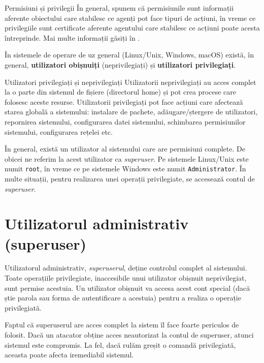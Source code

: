 \begin{definition}{Permisiuni și privilegii}
În general, spunem că permisiunile sunt informații
aferente obiectului care stabilesc ce agenți pot face tipuri de acțiuni, în
vreme ce privilegiile sunt certificate aferente agentului care stabilesc ce
acțiuni poate acesta întreprinde. Mai multe informații găsiți în
.
\end{definition}

În sistemele de operare de uz general (Linux/Unix, Windows, macOS) există, în
general, \textbf{utilizatori obișnuiți} (neprivilegiați) și \textbf{utilizatori privilegiați}.

\begin{definition}{Utilizatori privilegiați și neprivilegiați}
Utilizatorii neprivilegiați au acces complet la o parte din sistemul de fișiere
(directorul home) și pot crea procese care folosesc aceste resurse. Utilizatorii
privilegiați pot face acțiuni care afectează starea globală a sistemului:
instalare de pachete, adăugare/ștergere de utilizatori, repornirea sistemului,
configurarea datei sistemului, schimbarea permisiunilor sistemului, configurarea
rețelei etc.
\end{definition}

În general, există un utilizator al sistemului care are permisiuni complete.
De obicei ne referim la acest utilizator ca \textit{superuser}. Pe sistemele
Linux/Unix este numit \texttt{root}, în vreme ce pe sistemele Windows este numit
\texttt{Administrator}. În multe situații, pentru realizarea unei operații
privilegiate, se accesează contul de \textit{superuser}.

\section{Utilizatorul administrativ (superuser)}
\label{sec:user:superuser}

Utilizatorul administrativ, \textit{superuserul}, deține controlul complet al
sistemului. Toate operațiile privilegiate, inaccesibile unui utilizator obișnuit
neprivilegiat, sunt permise acestuia. Un utilizator obișnuit va accesa acest
cont special (dacă știe parola sau forma de autentificare a acestuia) pentru a
realiza o operație privilegiată.

Faptul că superuserul are acces complet la sistem îl face foarte periculos de
folosit. Dacă un atacator obține acces neautorizat la contul de superuser,
atunci sistemul este compromis. La fel, dacă rulăm greșit o comandă
privilegiată, aceasta poate afecta iremediabil sistemul.

